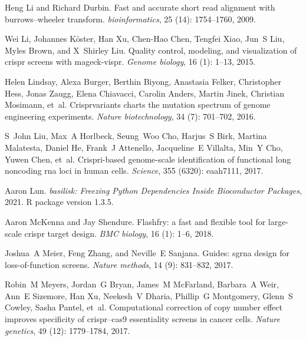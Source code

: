 \documentclass[pdftex,english,10pt]{article}
\begin{document}
{\begin{thebibliography}{105}
Heng Li and Richard Durbin.
\newblock Fast and accurate short read alignment with burrows--wheeler
  transform.
\newblock \emph{bioinformatics}, 25 (14): 1754--1760, 2009.

Wei Li, Johannes K{\"o}ster, Han Xu, Chen-Hao Chen, Tengfei Xiao, Jun~S Liu,
  Myles Brown, and X~Shirley Liu.
\newblock Quality control, modeling, and visualization of crispr screens with
  mageck-vispr.
\newblock \emph{Genome biology}, 16 (1): 1--13, 2015.

Helen Lindsay, Alexa Burger, Berthin Biyong, Anastasia Felker, Christopher
  Hess, Jonas Zaugg, Elena Chiavacci, Carolin Anders, Martin Jinek, Christian
  Mosimann, et~al.
\newblock Crisprvariants charts the mutation spectrum of genome engineering
  experiments.
\newblock \emph{Nature biotechnology}, 34 (7): 701--702,
  2016.

S~John Liu, Max~A Horlbeck, Seung~Woo Cho, Harjus~S Birk, Martina Malatesta,
  Daniel He, Frank~J Attenello, Jacqueline~E Villalta, Min~Y Cho, Yuwen Chen,
  et~al.
\newblock Crispri-based genome-scale identification of functional long
  noncoding rna loci in human cells.
\newblock \emph{Science}, 355 (6320): eaah7111, 2017.

Aaron Lun.
\newblock \emph{basilisk: Freezing Python Dependencies Inside Bioconductor
  Packages}, 2021.
\newblock R package version 1.3.5.

Aaron McKenna and Jay Shendure.
\newblock Flashfry: a fast and flexible tool for large-scale crispr target
  design.
\newblock \emph{BMC biology}, 16 (1): 1--6, 2018.

Joshua~A Meier, Feng Zhang, and Neville~E Sanjana.
\newblock Guides: sgrna design for loss-of-function screens.
\newblock \emph{Nature methods}, 14 (9): 831--832, 2017.

Robin~M Meyers, Jordan~G Bryan, James~M McFarland, Barbara~A Weir, Ann~E
  Sizemore, Han Xu, Neekesh~V Dharia, Phillip~G Montgomery, Glenn~S Cowley,
  Sasha Pantel, et~al.
\newblock Computational correction of copy number effect improves specificity
  of crispr--cas9 essentiality screens in cancer cells.
\newblock \emph{Nature genetics}, 49 (12): 1779--1784, 2017.


\end{thebibliography}}
\end{document}
